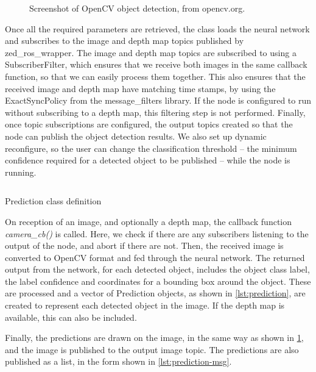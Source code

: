 \documentclass[\rootfolder/main.tex]{subfiles}
\begin{document}
\begin{figure}[ht]
    \caption{Screenshot of OpenCV object detection, from opencv.org.\label{fig:opencv}}
\end{figure}

Once all the required parameters are retrieved, the class loads the neural network and subscribes to the image and depth map topics published by zed\_ros\_wrapper.
The image and depth map topics are subscribed to using a SubscriberFilter, which ensures that we receive both images in the same callback function, so that we can easily process them together.
This also ensures that the received image and depth map have matching time stamps, by using the ExactSyncPolicy from the message\_filters library.
If the node is configured to run without subscribing to a depth map, this filtering step is not performed.
Finally, once topic subscriptions are configured, the output topics created so that the node can publish the object detection results.
We also set up dynamic reconfigure, so the user can change the classification threshold -- the minimum confidence required for a detected object to be published -- while the node is running.

\begin{listing}
    \inputminted{cpp}{\rootfolder/Chapters/Chapter5/Listings/Prediction}
    \caption{Prediction class definition\label{lst:prediction}}
\end{listing}

On reception of an image, and optionally a depth map, the callback function \emph{camera\_cb()} is called.
Here, we check if there are any subscribers listening to the output of the node, and abort if there are not.
Then, the received image is converted to OpenCV format and fed through the neural network.
The returned output from the network, for each detected object, includes the object class label, the label confidence and coordinates for a bounding box around the object.
These are processed and a vector of Prediction objects, as shown in \cref{lst:prediction}, are created to represent each detected object in the image.
If the depth map is available, this can also be included.

Finally, the predictions are drawn on the image, in the same way as shown in \cref{fig:opencv}, and the image is published to the output image topic.
The predictions are also published as a list, in the form shown in \cref{lst:prediction-msg}.

\end{document}
